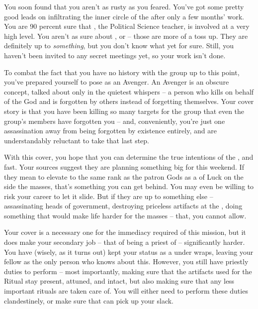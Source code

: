 \documentclass[char]{GL2020}
\begin{document}
You soon found that you aren’t as rusty as you feared. You’ve got some pretty good leads on infiltrating the inner circle of the \pGoaties{} after only a few months' work. You are 90 percent sure that \cChupInventor{}, the Political Science teacher, is involved at a very high level. You aren’t as sure about \cChupSecond{}, or \cWildCard{} -- those are more of a toss up. They are definitely up to \emph{something}, but you don’t know what yet for sure. Still, you haven’t been invited to any secret meetings yet, so your work isn’t done. 

To combat the fact that you have no history with the group up to this point, you’ve prepared yourself to pose as an Avenger. An Avenger is an obscure concept, talked about only in the quietest whispers -- a person who kills on behalf of the God \cGenesis{} and is forgotten by others instead of forgetting themselves. Your cover story is that you have been killing so many targets for the group that even the group’s members have forgotten you -- and, conveniently, you’re just one assassination away from being forgotten by existence entirely, and are understandably reluctant to take that last step.

With this cover, you hope that you can determine the true intentions of the \pGoaties{}, and fast. Your sources suggest they are planning something big for this weekend. If they mean to elevate \cGenesis{} to the same rank as the patron Gods as a \cGenesis{\Deity} of Luck on the side the masses, that’s something you can get behind. You may even be willing to risk your career to let it slide. But if they are up to something else -- assassinating heads of government, destroying priceless artifacts at the \pSchool{}, doing something that would make life harder for the masses -- that, you cannot allow.

Your cover is a necessary one for the immediacy required of this mission, but it does make your secondary job -- that of being a priest of \cFarmGod{} -- significantly harder. You have (wisely, as it turns out) kept your status as a \cInterpol{\clergy} under wraps, leaving your fellow \pFarm{} \cHedonist{\clergy} \cHedonist{} as the only person who knows about this. However, you still have priestly duties to perform -- most importantly, making sure that the artifacts used for the Ritual stay present, attuned, and intact, but also making sure that any less important rituals are taken care of. You will either need to perform these duties clandestinely, or make sure that \cHedonist{} can pick up your slack.
\end{document}
